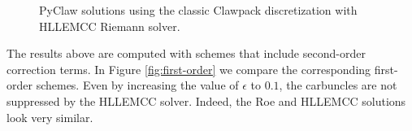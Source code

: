 \documentclass{article}
\begin{document}
\begin{figure}
  \begin{centering}
  \end{centering}
  \caption{
    PyClaw solutions using the classic Clawpack discretization
    with HLLEMCC Riemann solver.\label{fig:hllemcc}}
\end{figure}

The results above are computed with schemes that include second-order
correction terms.  In Figure \ref{fig:first-order} we compare the corresponding
first-order schemes.  Even by increasing the value of $\epsilon$ to $0.1$,
the carbuncles are not suppressed by the HLLEMCC solver.  Indeed, the Roe
and HLLEMCC solutions look very similar.
\end{document}
